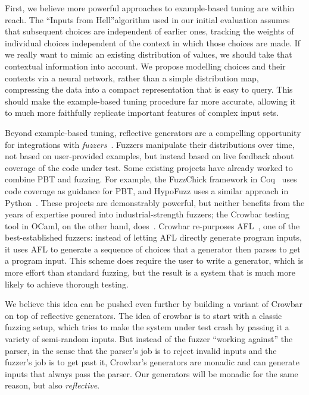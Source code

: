 First, we believe more powerful approaches to example-based tuning are
within reach.  The
``Inputs from Hell''\iflater{}\fi algorithm used in
our initial evaluation assumes
that subsequent choices are
independent of earlier ones, tracking the weights of individual
choices independent of the
context in which those choices are made. If we really want to mimic an existing
distribution of values, we should take that contextual information into
account. We propose modelling choices and their contexts via a neural network,
rather than a simple distribution map, compressing the data into a compact
representation that is easy to query.
This should make the example-based tuning
procedure far more accurate, allowing it to much more faithfully replicate
important features of complex input sets.

Beyond example-based tuning, reflective generators are a compelling opportunity
for integrations with
{\em fuzzers}~\cn {}. Fuzzers manipulate their distributions over time, not based on
user-provided examples, but instead based on live feedback about coverage of the
code under test.
Some existing projects have already worked to
combine PBT and fuzzing.
For example, the FuzzChick framework in Coq~\cite{DBLP:journals/pacmpl/Lampropoulos0P19}
uses code coverage as guidance for PBT, and HypoFuzz uses a
similar approach in Python~\cite{hatfield-dodds_hypofuzz_nodate}. These projects
are demonstrably powerful, but neither benefits from the years of expertise
poured into industrial-strength fuzzers; the Crowbar testing tool in
OCaml, on the other hand,
does~\cite{dolan2017testing}. Crowbar re-purposes
AFL~\cite{afl-readme}, one of the best-established
fuzzers: instead of letting AFL directly generate program inputs, it
uses AFL
to generate a sequence of choices that a generator then parses to get a program input.
This scheme
does require the user to write a generator, which is more effort
than standard fuzzing, but the result is a system that is much more likely
to achieve thorough testing.

We believe this idea can be pushed even further by building
a variant of Crowbar on top of reflective generators.
The idea of crowbar is to start with a classic fuzzing setup, which tries to make the
system under test
crash by passing it a variety of semi-random inputs. But instead of
the fuzzer
``working against'' the parser, in the sense that the parser's job is to reject
invalid inputs and the fuzzer's job is to get past it, Crowbar's generators are
monadic and can generate
inputs that always pass the parser. Our generators will be monadic for the same
reason, but also {\em reflective}.

